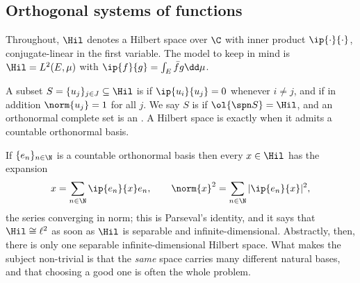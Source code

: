 \subsection{Orthogonal systems of functions}

Throughout, $\Hil$ denotes a Hilbert space over $\C$ with inner product $\ip{\cdot}{\cdot}$, conjugate-linear in the first variable. The model to keep in mind is $\Hil = L^2(E,\mu)$ with $\ip{f}{g} = \int_E \bar f g \dd \mu$.

\begin{definition}
	A subset $S = \{u_j\}_{j \in J} \subseteq \Hil$ is  if $\ip{u_i}{u_j} = 0$ whenever $i \ne j$, and  if in addition $\norm{u_j} = 1$ for all $j$. We say $S$ is  if $\ol{\spn S} = \Hil$, and an orthonormal complete set is an . A Hilbert space is  exactly when it admits a countable orthonormal basis.
\end{definition}

If $\{e_n\}_{n \in \N}$ is a countable orthonormal basis then every $x \in \Hil$ has the expansion
$$x = \sum_{n \in \N} \ip{e_n}{x} e_n, \qquad \norm{x}^2 = \sum_{n \in \N} |\ip{e_n}{x}|^2,$$
the series converging in norm; this is Parseval's identity, and it says that $\Hil \cong \ell^2$ as soon as $\Hil$ is separable and infinite-dimensional. Abstractly, then, there is only one separable infinite-dimensional Hilbert space. What makes the subject non-trivial is that the \emph{same} space carries many different natural bases, and that choosing a good one is often the whole problem.

